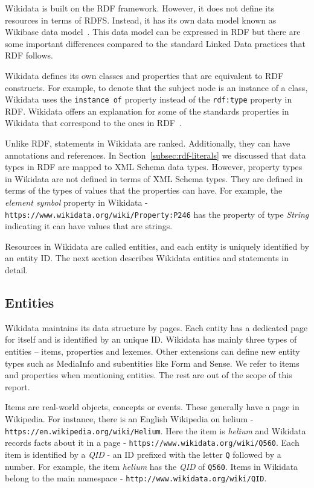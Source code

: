 Wikidata is built on the RDF framework. However, it does not define its resources in terms of RDFS. Instead, it has its own data model known as Wikibase data model~\citep{MediaWiki}. This data model can be expressed in RDF but there are some important differences compared to the standard Linked Data practices that RDF follows. 

Wikidata defines its own classes and properties that are equivalent to RDF constructs. For example, to denote that the subject node is an instance of a class, Wikidata uses the \texttt{instance of} property instead of the \texttt{rdf:type} property in RDF. Wikidata offers an explanation for some of the standards properties in Wikidata that correspond to the ones in RDF~\cite{Foundation}. 

Unlike RDF, statements in Wikidata are ranked. Additionally, they can have annotations and references. In Section~\ref{subsec:rdf-literals} we discussed that data types in RDF are mapped to XML Schema data types. However, property types in Wikidata are not defined in terms of XML Schema types. They are defined in terms of the types of values that the properties can have. For example, the \textit{element symbol} property in Wikidata - \texttt{https://www.wikidata.org/wiki/Property:P246} has the property of type \textit{String} indicating it can have values that are strings.

Resources in Wikidata are called entities, and each entity is uniquely identified by an entity ID. The next section describes Wikidata entities and statements in detail.

\subsection{Entities}
Wikidata maintains its data structure by pages. Each entity has a dedicated page for itself and is identified by an unique ID. Wikidata has mainly three types of entities – items, properties and lexemes. Other extensions can define new entity types such as MediaInfo and subentities like Form and Sense. We refer to items and properties when mentioning entities. The rest are out of the scope of this report.

Items are real-world objects, concepts or events.  These generally have a page in Wikipedia. For instance, there is an English Wikipedia on helium - \texttt{https://en.wikipedia.org/wiki/Helium}. Here the item is \textit{helium} and Wikidata records facts about it in a page - \texttt{https://www.wikidata.org/wiki/Q560}. Each item is identified by a \textit{QID} - an ID prefixed with the letter \texttt{Q} followed by a number. For example, the item \textit{helium} has the \textit{QID} of \texttt{Q560}. Items in Wikidata belong to the main namespace - \texttt{http://www.wikidata.org/wiki/QID}. 

